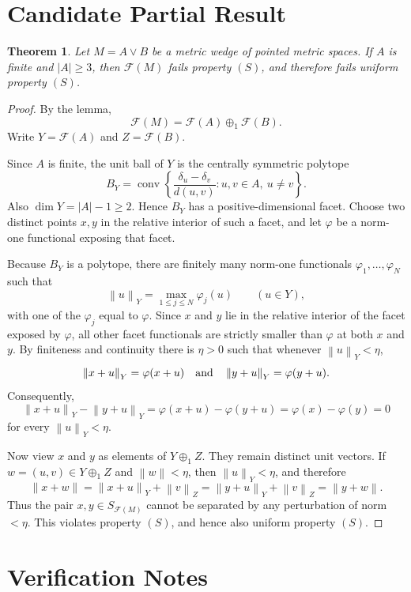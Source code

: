 \documentclass[11pt]{article}
\newtheorem{theorem}{Theorem}
\newcommand{\Free}{\mathcal F}
\newcommand{\Ball}{B}
\newcommand{\norm}[1]{\left\lVert #1 \right\rVert}
\begin{document}
\section*{Candidate Partial Result}

\begin{theorem}
Let $M=A\vee B$ be a metric wedge of pointed metric spaces. If $A$ is
finite and $|A|\ge 3$, then $\Free(M)$ fails property $(S)$, and
therefore fails uniform property $(S)$.
\end{theorem}

\begin{proof}
By the lemma,
\[
  \Free(M)=\Free(A)\oplus_1\Free(B).
\]
Write $Y=\Free(A)$ and $Z=\Free(B)$.

Since $A$ is finite, the unit ball of $Y$ is the centrally symmetric
polytope
\[
  \Ball_Y=
  \operatorname{conv}
  \left\{
  \frac{\delta_u-\delta_v}{d(u,v)}:
  u,v\in A,\ u\neq v
  \right\}.
\]
Also $\dim Y=|A|-1\ge 2$. Hence $\Ball_Y$ has a positive-dimensional
facet. Choose two distinct points $x,y$ in the relative interior of such
a facet, and let $\varphi$ be a norm-one functional exposing that facet.

Because $\Ball_Y$ is a polytope, there are finitely many norm-one
functionals $\varphi_1,\ldots,\varphi_N$ such that
\[
  \norm{u}_Y=\max_{1\le j\le N}\varphi_j(u)
  \qquad(u\in Y),
\]
with one of the $\varphi_j$ equal to $\varphi$. Since $x$ and $y$ lie in
the relative interior of the facet exposed by $\varphi$, all other facet
functionals are strictly smaller than $\varphi$ at both $x$ and $y$.
By finiteness and continuity there is $\eta>0$ such that whenever
$\norm{u}_Y<\eta$,
\[
  \norm{x+u}_Y=\varphi(x+u)
  \quad\hbox{and}\quad
  \norm{y+u}_Y=\varphi(y+u).
\]
Consequently,
\[
  \norm{x+u}_Y-\norm{y+u}_Y
  =
  \varphi(x+u)-\varphi(y+u)
  =
  \varphi(x)-\varphi(y)
  =
  0
\]
for every $\norm{u}_Y<\eta$.

Now view $x$ and $y$ as elements of $Y\oplus_1 Z$. They remain distinct
unit vectors. If $w=(u,v)\in Y\oplus_1 Z$ and $\norm{w}<\eta$, then
$\norm{u}_Y<\eta$, and therefore
\[
  \norm{x+w}
  =
  \norm{x+u}_Y+\norm{v}_Z
  =
  \norm{y+u}_Y+\norm{v}_Z
  =
  \norm{y+w}.
\]
Thus the pair $x,y\in S_{\Free(M)}$ cannot be separated by any
perturbation of norm $<\eta$. This violates property $(S)$, and hence
also uniform property $(S)$.
\end{proof}

\section*{Verification Notes}
\end{document}
